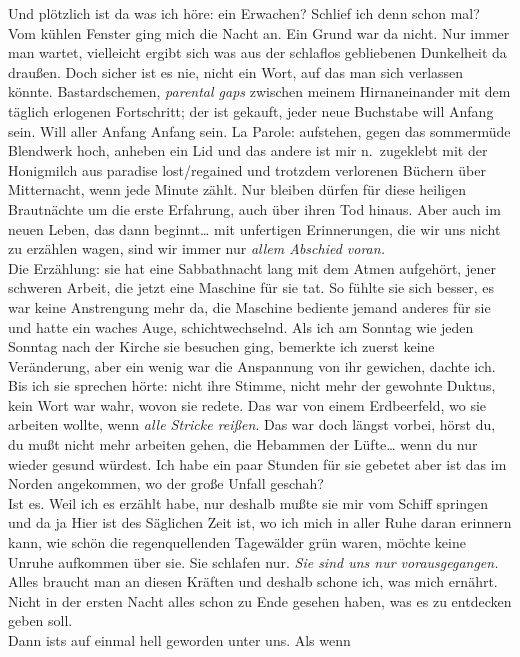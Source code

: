 \documentclass[
]{article}
\begin{document}
Und plötzlich ist da was ich höre: ein Erwachen? Schlief ich denn schon
mal? Vom kühlen Fenster ging mich die Nacht an. Ein Grund war da nicht.
Nur immer man wartet, vielleicht ergibt sich was aus der schlaflos
gebliebenen Dunkelheit da draußen. Doch sicher ist es nie, nicht ein
Wort, auf das man sich verlassen könnte. Bastardschemen, \emph{parental
gaps} zwischen meinem Hirnaneinander mit dem täglich erlogenen
Fortschritt; der ist gekauft, jeder neue Buchstabe will Anfang sein.
Will aller Anfang Anfang sein. La Parole: aufstehen, gegen das
sommermüde Blendwerk hoch, anheben ein Lid und das andere ist mir
n.~zugeklebt mit der Honigmilch aus paradise lost/regained und trotzdem
verlorenen Büchern über Mitternacht, wenn jede Minute zählt. Nur bleiben
dürfen für diese heiligen Brautnächte um die erste Erfahrung, auch über
ihren Tod hinaus. Aber auch im neuen Leben, das dann beginnt\ldots{} mit
unfertigen Erinnerungen, die wir uns nicht zu erzählen wagen, sind wir
immer nur \emph{allem Abschied voran.}\\
Die Erzählung: sie hat eine Sabbathnacht lang mit dem Atmen aufgehört,
jener schweren Arbeit, die jetzt eine Maschine für sie tat. So fühlte
sie sich besser, es war keine Anstrengung mehr da, die Maschine bediente
jemand anderes für sie und hatte ein waches Auge, schichtwechselnd. Als
ich am Sonntag wie jeden Sonntag nach der Kirche sie besuchen ging,
bemerkte ich zuerst keine Veränderung, aber ein wenig war die Anspannung
von ihr gewichen, dachte ich. Bis ich sie sprechen hörte: nicht ihre
Stimme, nicht mehr der gewohnte Duktus, kein Wort war wahr, wovon sie
redete. Das war von einem Erdbeerfeld, wo sie arbeiten wollte, wenn
\emph{alle Stricke reißen}. Das war doch längst vorbei, hörst du, du
mußt nicht mehr arbeiten gehen, die Hebammen der Lüfte\ldots{} wenn du
nur wieder gesund würdest. Ich habe ein paar Stunden für sie gebetet
aber ist das im Norden angekommen, wo der große Unfall geschah?\\
Ist es. Weil ich es erzählt habe, nur deshalb mußte sie mir vom Schiff
springen und da ja Hier ist des Säglichen Zeit ist, wo ich mich in aller
Ruhe daran erinnern kann, wie schön die regenquellenden Tagewälder grün
waren, möchte keine Unruhe aufkommen über sie. Sie schlafen nur.
\emph{Sie sind uns nur vorausgegangen.} Alles braucht man an diesen
Kräften und deshalb schone ich, was mich ernährt. Nicht in der ersten
Nacht alles schon zu Ende gesehen haben, was es zu entdecken geben
soll.\\
Dann ist\textquotesingle s auf einmal hell geworden unter uns. Als wenn
\end{document}
